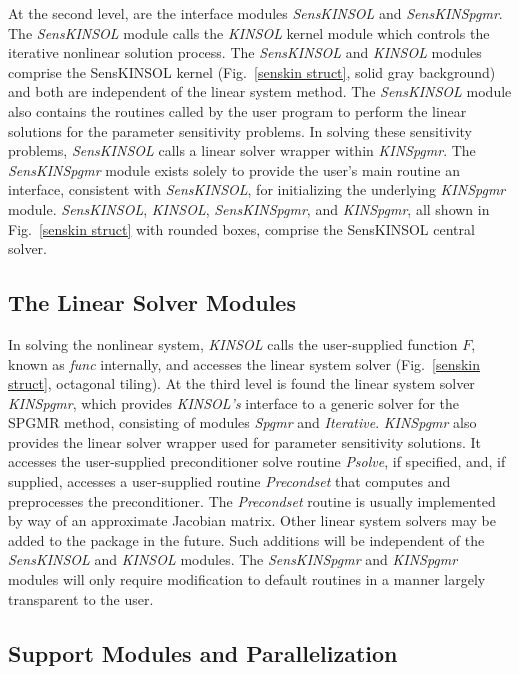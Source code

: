 \documentclass[11pt]{article}
\begin{document}
At the second level, are the interface modules {\em SensKINSOL} and
{\em SensKINSpgmr}. The {\em SensKINSOL} module calls the {\em KINSOL}
kernel module which controls the iterative nonlinear solution process.
The {\em SensKINSOL} and {\em KINSOL} modules comprise the SensKINSOL
kernel (\mbox{Fig. \ref{senskin struct}}, solid gray background) and
both are independent of the linear system method. The {\em SensKINSOL}
module also contains the routines called by the user program to perform
the linear solutions for the parameter sensitivity problems. In solving
these sensitivity problems, {\em SensKINSOL} calls a linear solver
wrapper within {\em KINSpgmr}. The \mbox{\em SensKINSpgmr} module
exists solely to provide the user's main routine an interface,
consistent with {\em SensKINSOL}, for initializing the underlying {\em
KINSpgmr} module. \mbox{\em SensKINSOL}, \mbox{\em KINSOL}, {\em
SensKINSpgmr}, and {\em KINSpgmr}, all shown in \mbox{Fig. \ref{senskin
struct}} with rounded boxes, comprise the SensKINSOL central solver.

\subsection{The Linear Solver Modules}

In solving the nonlinear system, {\em KINSOL} calls the user-supplied
function $F$, known as {\em func} internally, and accesses the linear
system solver (\mbox{Fig. \ref{senskin struct}}, octagonal tiling). At
the third level is found the linear system solver {\em KINSpgmr}, which
provides {\em KINSOL's} interface to a generic solver for the SPGMR
method, consisting of modules {\em Spgmr} and {\em Iterative}. {\em
KINSpgmr} also provides the linear solver wrapper used for parameter
sensitivity solutions. It accesses the user-supplied preconditioner
solve routine {\em Psolve}, if specified, and, if supplied, accesses a
user-supplied routine {\em Precondset} that computes and preprocesses
the preconditioner. The {\em Precondset} routine is usually implemented
by way of an approximate Jacobian matrix. Other linear system solvers
may be added to the package in the future. Such additions will be
independent of the {\em SensKINSOL} and {\em KINSOL} modules. The {\em
SensKINSpgmr} and {\em KINSpgmr} modules will only require
modification to default routines in a manner largely transparent to
the user.

\subsection{Support Modules and Parallelization}
\label{subsec:SupportMod}
\end{document}
